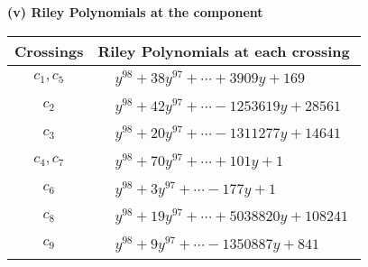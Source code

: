 \documentclass[1p]{elsarticle_modified}
\theoremstyle{definition}
\begin{document}
\newpage\renewcommand{\arraystretch}{1}
\flushleft \textbf{(v) Riley Polynomials at the component}\newline \\
\begin{tabular}{m{50pt}|m{274pt}}
Crossings & \hspace{64pt}Riley Polynomials at each crossing \\
\hline $$\begin{aligned}c_{1},c_{5}\end{aligned}$$&$\begin{aligned}
&y^{98}+38 y^{97}+\cdots+3909 y+169
\end{aligned}$\\
\hline $$\begin{aligned}c_{2}\end{aligned}$$&$\begin{aligned}
&y^{98}+42 y^{97}+\cdots-1253619 y+28561
\end{aligned}$\\
\hline $$\begin{aligned}c_{3}\end{aligned}$$&$\begin{aligned}
&y^{98}+20 y^{97}+\cdots-1311277 y+14641
\end{aligned}$\\
\hline $$\begin{aligned}c_{4},c_{7}\end{aligned}$$&$\begin{aligned}
&y^{98}+70 y^{97}+\cdots+101 y+1
\end{aligned}$\\
\hline $$\begin{aligned}c_{6}\end{aligned}$$&$\begin{aligned}
&y^{98}+3 y^{97}+\cdots-177 y+1
\end{aligned}$\\
\hline $$\begin{aligned}c_{8}\end{aligned}$$&$\begin{aligned}
&y^{98}+19 y^{97}+\cdots+5038820 y+108241
\end{aligned}$\\
\hline $$\begin{aligned}c_{9}\end{aligned}$$&$\begin{aligned}
&y^{98}+9 y^{97}+\cdots-1350887 y+841
\end{aligned}$\\

\end{tabular}
\end{document}
